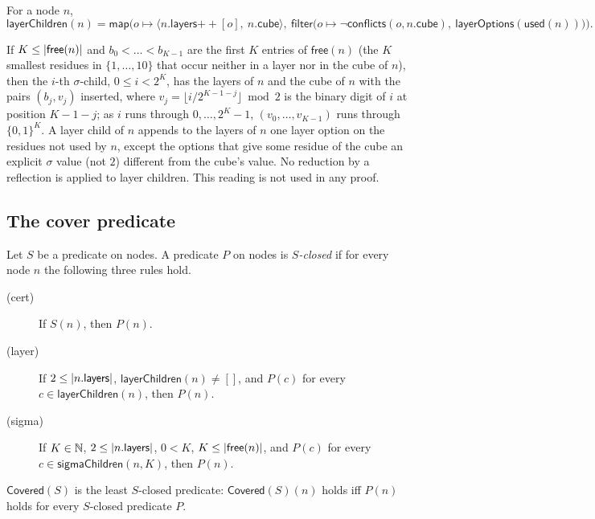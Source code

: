 \begin{definition}\label{cb:def:layerchildren}
For a node $n$,
\[
\mathsf{layerChildren}(n)=\mathsf{map}\Big(o\mapsto\langle n.\mathsf{layers}\mathbin{+\!\!+}[o],\
n.\mathsf{cube}\rangle,\ \mathsf{filter}\big(o\mapsto\neg\mathsf{conflicts}(o,n.\mathsf{cube}),\
\mathsf{layerOptions}(\mathsf{used}(n))\big)\Big).
\]
\end{definition}

\begin{remark}\label{cb:rem:children}
If $K\le\lvert\mathsf{free}(n)\rvert$ and $b_0<\dots<b_{K-1}$ are the first $K$ entries of $\mathsf{free}(n)$ (the $K$
smallest residues in $\{1,\dots,10\}$ that occur neither in a layer nor in the cube of $n$), then the $i$-th
$\sigma$-child, $0\le i<2^K$, has the layers of $n$ and the cube of $n$ with the pairs $(b_j,v_j)$ inserted, where
$v_j=\lfloor i/2^{K-1-j}\rfloor\bmod2$ is the binary digit of $i$ at position $K-1-j$; as $i$ runs through
$0,\dots,2^K-1$, $(v_0,\dots,v_{K-1})$ runs through $\{0,1\}^K$. A layer child of $n$ appends to the layers of $n$ one
layer option on the residues not used by $n$, except the options that give some residue of the cube an explicit
$\sigma$ value (not $2$) different from the cube's value. No reduction by a reflection is applied to layer children.
This reading is not used in any proof.
\end{remark}

\subsection{The cover predicate}\label{cb:sec:covered}

\begin{definition}\label{cb:def:covered}
Let $S$ be a predicate on nodes. A predicate $P$ on nodes is \emph{$S$-closed} if for every node $n$ the following
three rules hold.
\begin{description}
\item[(cert)] If $S(n)$, then $P(n)$.
\item[(layer)] If $2\le\lvert n.\mathsf{layers}\rvert$, $\mathsf{layerChildren}(n)\ne[]$, and $P(c)$ for every
  $c\in\mathsf{layerChildren}(n)$, then $P(n)$.
\item[(sigma)] If $K\in\mathbb N$, $2\le\lvert n.\mathsf{layers}\rvert$, $0<K$, $K\le\lvert\mathsf{free}(n)\rvert$, and $P(c)$ for every
  $c\in\mathsf{sigmaChildren}(n,K)$, then $P(n)$.
\end{description}
$\mathsf{Covered}(S)$ is the least $S$-closed predicate: $\mathsf{Covered}(S)(n)$ holds iff $P(n)$ holds for every
$S$-closed predicate $P$.
\end{definition}

